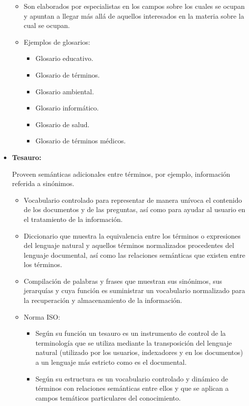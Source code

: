 \documentclass[a4paper,12pt,twoside,final,spanish]{article}
\begin{document}
\begin{itemize}
\begin{itemize}
\item Son elaborados por especialistas en los campos sobre los cuales se ocupan y apuntan a llegar más allá de aquellos interesados en la materia sobre la cual se ocupan.

\item Ejemplos de glosarios:
	\begin{itemize}
	\item Glosario educativo.
	\item Glosario de términos.
	\item Glosario ambiental.
	\item Glosario informático.
	\item Glosario de salud.
	\item Glosario de términos médicos.	
	\end{itemize}
\end{itemize}

\item \textbf{Tesauro:}

Proveen semánticas adicionales entre términos, por ejemplo, información referida a sinónimos.

\begin{itemize}
\item Vocabulario controlado para representar de manera unívoca el contenido de los documentos y de las preguntas, así como para ayudar al usuario en el tratamiento de la información.

\item Diccionario que muestra la equivalencia entre los términos o expresiones del lenguaje natural y aquellos términos normalizados procedentes del lenguaje documental, así como las relaciones semánticas que existen entre los términos.

\item Compilación de palabras y frases que muestran sus sinónimos, sus jerarquías y cuya función es suministrar un vocabulario normalizado para la recuperación y almacenamiento de la información.
\item Norma ISO:
	\begin{itemize}
	\item Según su función un tesauro es un instrumento de control de la terminología 		que se utiliza mediante la transposición del lenguaje natural (utilizado por los 		usuarios, indexadores y en los documentos) a un lenguaje más estricto como es el 		documental. 
	\item Según su estructura es un vocabulario controlado y dinámico de términos con 		relaciones semánticas entre ellos y que se aplican a campos temáticos particulares 	del conocimiento.
	\end{itemize}


\end{itemize}
\end{itemize}
\end{document}
